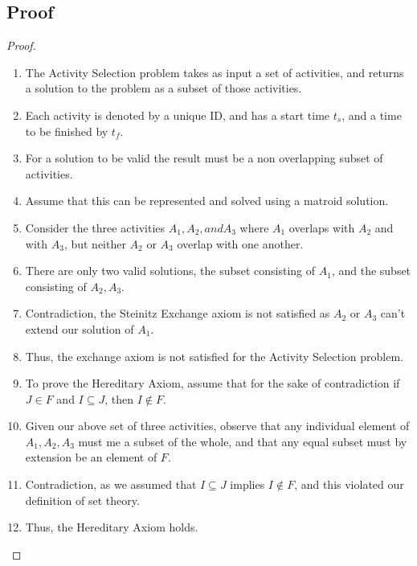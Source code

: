 \documentclass{article}
\begin{document}
\subsection{Proof}
\begin{proof}
      \begin{enumerate}
            \item The Activity Selection problem takes as input a set of activities, and
                  returns a solution to the problem as a subset of those activities.
            \item Each activity is denoted by a unique ID, and has a start time \(t_s\),
                  and a time to be finished by \(t_f\).
            \item For a solution to be valid the result must be a non overlapping subset
                  of activities.
            \item Assume that this can be represented and solved using a matroid solution.
            \item Consider the three activities \({A_1, A_2, and A_3}\) where \(A_1\)
                  overlaps with \(A_2\) and with \(A_3\), but neither \(A_2\) or \(A_3\)
                  overlap with one another.
            \item There are only two valid solutions, the subset consisting of \(A_1\),
                  and the subset consisting of \({A_2, A_3}\).
            \item Contradiction, the Steinitz Exchange axiom is not satisfied as \(A_2\)
                  or \(A_3\) can't extend our solution of \({A_1}\).
            \item Thus, the exchange axiom is not satisfied for the Activity Selection
                  problem.
            \item To prove the Hereditary Axiom, assume that for the sake of contradiction
                  if \(J \in F\) and \(I \subseteq J\), then \(I \notin F\).
            \item Given our above set of three activities, observe that any individual element of
                  \({A_1, A_2, A_3}\) must me a subset of the whole, and that any equal
                  subset must by extension be an element of \(F\).
            \item Contradiction, as we assumed that \(I \subseteq J\) implies \(I \notin
                  F\), and this violated our definition of set theory.
            \item Thus, the Hereditary Axiom holds.
      \end{enumerate}
\end{proof}
\end{document}
